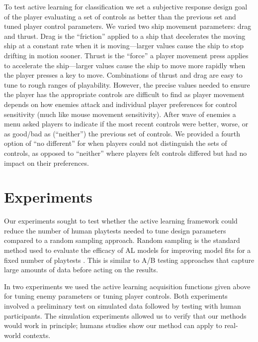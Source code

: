 \documentclass{sig-alternate}
\begin{document}
To test active learning for classification we set a subjective response design goal of the player evaluating a set of controls as better than the previous set and tuned player control parameters.
We varied two ship movement parameters: drag and thrust. 
Drag is the ``friction'' applied to a ship that decelerates the moving ship at a constant rate when it is moving---larger values cause the ship to stop drifting in motion sooner. 
Thrust is the ``force'' a player movement press applies to accelerate the ship---larger values cause the ship to move more rapidly when the player presses a key to move. 
%
Combinations of thrust and drag are easy to tune to rough ranges of playability.
However, the precise values needed to ensure the player has the appropriate controls are difficult to find as player movement depends on how enemies attack and individual player preferences for control sensitivity (much like mouse movement sensitivity). 
After wave of enemies a menu asked players to indicate if the most recent controls were better, worse, or as good/bad as (``neither'') the previous set of controls.
We provided a fourth option of ``no different'' for when players could not distinguish the sets of controls, as opposed to ``neither'' where players felt controls differed but had no impact on their preferences.





\section{Experiments}
Our experiments sought to test whether the active learning framework could reduce the number of human playtests needed to tune design parameters compared to a random sampling approach.
Random sampling is the standard method used to evaluate the efficacy of AL models for improving model fits for a fixed number of playtests \cite{settles2012:al-book}. This is similar to A/B testing approaches that capture large amounts of data before acting on the results.

In two experiments we used the active learning acquisition functions given above for tuning enemy parameters or tuning player controls.
Both experiments involved a preliminary test on simulated data followed by testing with human participants.
The simulation experiments allowed us to verify that our methods would work in principle; humans studies show our method can apply to real-world contexts.
\end{document}
